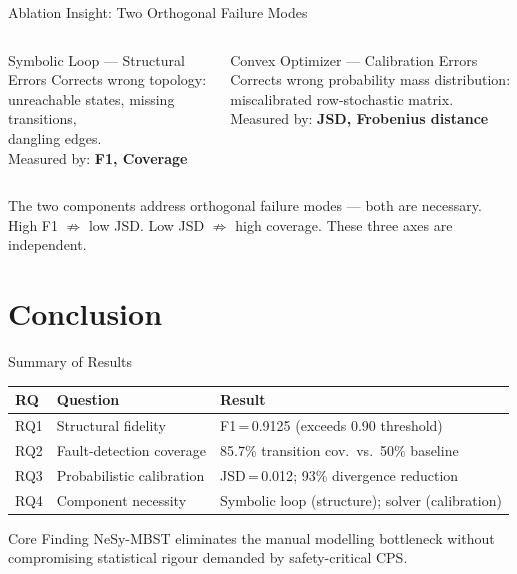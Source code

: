 \documentclass[aspectratio=169,10pt]{beamer}
\newcommand{\pos}[1]{\textcolor{positive}{#1}}
\newcommand{\HL}[1]{\textcolor{emphasis}{#1}}
\begin{document}
\begin{frame}{Ablation Insight: Two Orthogonal Failure Modes}
  \begin{columns}[T]
      \begin{exampleblock}{\pos{Symbolic Loop} — Structural Errors}
        Corrects wrong topology:\\
        unreachable states, missing transitions,\\
        dangling edges.\\[6pt]
        Measured by: \textbf{F1, Coverage}
      \end{exampleblock}
      \begin{exampleblock}{\pos{Convex Optimizer} — Calibration Errors}
        Corrects wrong probability mass distribution:\\
        miscalibrated row-stochastic matrix.\\[6pt]
        Measured by: \textbf{JSD, Frobenius distance}
      \end{exampleblock}
  \end{columns}
  \vspace{0.6em}
  \begin{center}
    \HL{The two components address orthogonal failure modes — both are necessary.}\\[4pt]
    \small High F1 $\not\Rightarrow$ low JSD. \quad Low JSD $\not\Rightarrow$ high coverage. \quad These three axes are independent.
  \end{center}
\end{frame}

\section{Conclusion}

\begin{frame}{Summary of Results}
  \begin{center}
  \begin{tabular}{l l l}
    \toprule
    \textbf{RQ} & \textbf{Question} & \textbf{Result} \\
    \midrule
    RQ1 & Structural fidelity & \pos{F1\,=\,0.9125} (exceeds 0.90 threshold) \\
    RQ2 & Fault-detection coverage & \pos{85.7\%} transition cov.\ vs.\ 50\% baseline \\
    RQ3 & Probabilistic calibration & \pos{JSD\,=\,0.012}; 93\% divergence reduction \\
    RQ4 & Component necessity & Symbolic loop (structure); solver (calibration) \\
    \bottomrule
  \end{tabular}
  \end{center}
  \vspace{0.4em}
  \begin{block}{Core Finding}
    NeSy-MBST \HL{eliminates the manual modelling bottleneck} without compromising statistical rigour demanded by safety-critical CPS.
  \end{block}
\end{frame}
\end{document}

